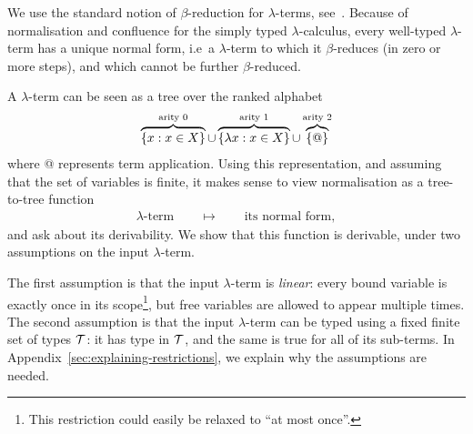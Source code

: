 We use the standard notion of $\beta$-reduction for $\lambda$-terms, see~\cite[Definition 1.2.1]{sorensen_lectures_2006}.  
Because of normalisation and confluence for the simply typed $\lambda$-calculus, every well-typed $\lambda$-term has a unique normal form, i.e~a $\lambda$-term to which it $\beta$-reduces (in zero or more steps), and which cannot be further $\beta$-reduced.

A $\lambda$-term  can be seen as a tree over the ranked alphabet
\begin{align}
    \label{eq:alphabet-for-lambda-terms}
  \overbrace{\{x : x \in X\}}^{\text{arity 0}} \cup \overbrace{\{\lambda x : x \in X\}}^{\text{arity 1}} \cup  \overbrace{\{@\}}^{\text{arity 2}}
\end{align}
where @ represents term application. Using this representation, and assuming that the set of variables is finite, it makes sense to view normalisation as a  tree-to-tree function
\begin{align*}
\text{$\lambda$-term} \qquad \mapsto \qquad \text{its normal form},
\end{align*}
and ask about its derivability.
 We show that this function is derivable, under two assumptions on the input $\lambda$-term. 
 
 The first assumption is that the input $\lambda$-term is \emph{linear}: 
    every bound variable is exactly once in its scope\footnote{This restriction could easily be relaxed to ``at most once''.}, but free variables are allowed to appear multiple times.  
     The second assumption is that  the input $\lambda$-term can be typed using a fixed finite set of types ${\mathcal T}$: it has type in ${\mathcal T}$, and the same is true for all of its  sub-terms.  In Appendix~\ref{sec:explaining-restrictions}, we explain why the  assumptions are needed.



